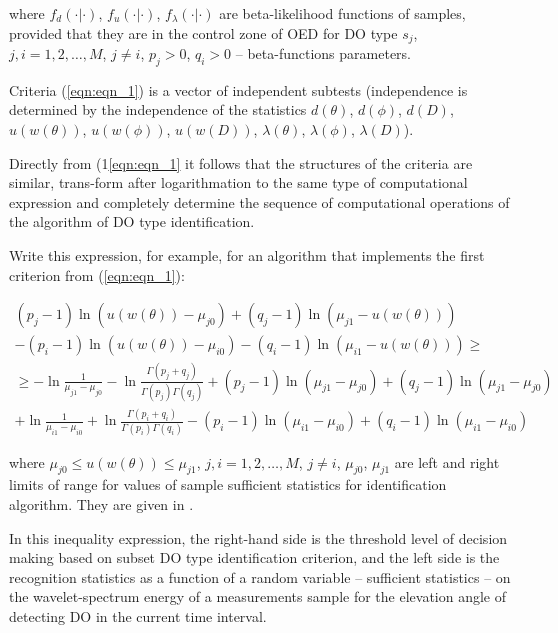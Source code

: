 where $f_d(\cdot | \cdot)$, $f_u(\cdot | \cdot)$, $f_{\lambda}(\cdot | \cdot)$ are beta-likelihood functions of samples, provided that they are in the control zone of OED for DO type $s_j$, $j,i = 1,2, \dots, M$, $j \ne i$, $p_j > 0$, $q_i > 0$ -- beta-functions parameters.
 
Criteria (\ref{eqn:eqn_1}) is a vector of independent subtests (independence is determined by the independence of the statistics $d(\theta)$, $d(\phi)$, $d(D)$, $u(w(\theta))$, $u(w(\phi))$, $u(w(D))$, $\lambda(\theta)$, $\lambda(\phi)$, $\lambda(D)$).
 
Directly from (1\ref{eqn:eqn_1} it follows that the structures of the criteria are similar, trans-form after logarithmation to the same type of computational expression and completely determine the sequence of computational operations of the algorithm of DO type identification.

Write this expression, for example, for an algorithm that implements the first criterion from (\ref{eqn:eqn_1}):

\begin{equation}\label{eqn:eqn_2}
\begin{gathered}
(p_j - 1) \ln(u(w(\theta)) - \mu_{j0}) + (q_j - 1) \ln(\mu_{j1} - u(w(\theta))) \\
- (p_i - 1) \ln(u(w(\theta)) - \mu_{i0}) - (q_i - 1) \ln(\mu_{i1} - u(w(\theta))) \ge \\
\ge -\ln{\frac{1}{\mu_{j1} - \mu_{j0}}} - \ln{\frac{\Gamma(p_j + q_j)}{\Gamma(p_j)\Gamma(q_j)}} + (p_j - 1) \ln(\mu_{j1} - \mu_{j0}) + (q_j - 1) \ln(\mu_{j1} - \mu_{j0}) \\
+ \ln{\frac{1}{\mu_{i1} - \mu_{i0}}} + \ln{\frac{\Gamma(p_i + q_i)}{\Gamma(p_i)\Gamma(q_i)}} - (p_i - 1) \ln(\mu_{i1} - \mu_{i0}) + (q_i - 1) \ln(\mu_{i1} - \mu_{i0})
\end{gathered}
\end{equation}

where $\mu_{j0} \le u(w(\theta)) \le \mu_{j1}$, $j,i = 1,2, \dots, M$, $j \ne i$, $\mu_{j0}$, $\mu_{j1}$ are left and right limits of range for values of sample sufficient statistics for identification algorithm.
They are given in \cite{bib_01}.

In this inequality expression, the right-hand side is the threshold level of decision making based on subset DO type identification criterion, and the left side is the recognition statistics as a function of a random variable -- sufficient statistics -- on the wavelet-spectrum energy of a measurements sample for the elevation angle of detecting DO in the current time interval.

